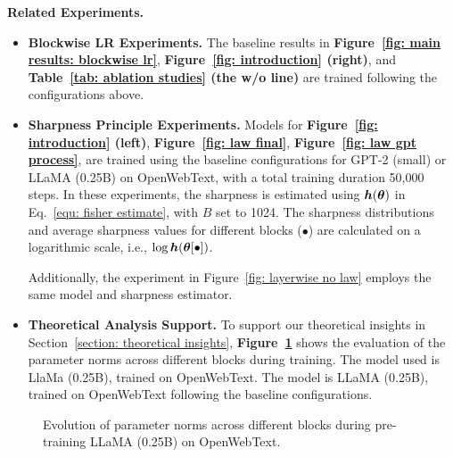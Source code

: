 {\bf Related Experiments.}
\begin{itemize}[leftmargin=2em]
    \item {\bf Blockwise LR Experiments.} The baseline results in {\bf Figure~\ref{fig: main results: blockwise lr}}, {\bf Figure~\ref{fig: introduction} (right)}, and {\bf Table~\ref{tab: ablation studies} (the w/o line)} are trained following the configurations above.
    
    \item {\bf Sharpness Principle Experiments.} Models for {\bf Figure~\ref{fig: introduction} (left)}, {\bf Figure~\ref{fig: law final}}, {\bf Figure~\ref{fig: law gpt process}}, are trained using the baseline configurations for GPT-2 (small) or LLaMA (0.25B) on OpenWebText, with a total training duration 50,000 steps.
    In these experiments, the sharpness is estimated using $\boldsymbol{h}(\boldsymbol{\theta})$ in Eq.~\eqref{equ: fisher estimate}, with $B$ set to 1024. The sharpness distributions and average sharpness values for different blocks ($\bullet$) are calculated on a logarithmic scale, i.e., $\log \boldsymbol{h}(\boldsymbol{\theta}[\bullet])$.

    Additionally, the experiment in Figure~\ref{fig: layerwise no law} employs the same model and sharpness estimator.
    
    \item {\bf Theoretical Analysis Support.} To support our theoretical insights in Section~\ref{section: theoretical insights}, {\bf Figure~\ref{fig: blockwise norm}} shows the evaluation of the parameter norms across different blocks during training. The model used is LlaMa (0.25B), trained on OpenWebText. The model is LLaMA (0.25B), trained on OpenWebText following the baseline configurations.
\end{itemize}



\begin{figure}[!ht]
    \centering
    \hspace{.4cm}
    \hspace{.4cm}
    \caption{Evolution of parameter norms across different blocks during pre-training LLaMA (0.25B) on OpenWebText.}
    \label{fig: blockwise norm}
\end{figure}




